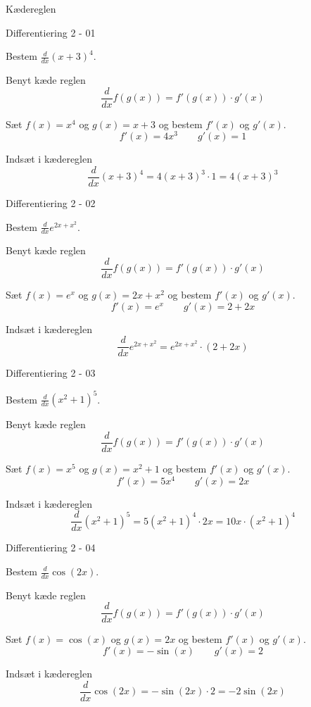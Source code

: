 \documentclass{article}
\begin{document}
Kædereglen
\tableofcontents
\newpage

\begin{exercise}{Differentiering 2 - 01}

Bestem $\frac{d}{dx} (x + 3)^4$.


\hint
Benyt kæde reglen
\[
\frac{d}{dx} f(g(x)) = f'(g(x)) \cdot g'(x)
\]

\hint
Sæt $f(x) = x^4$ og $g(x) = x + 3$ og bestem $f'(x)$ og $g'(x)$.
\[
f'(x) = 4 x^3 \qquad g'(x) = 1
\]

\hint
Indsæt i kædereglen
\[
\frac{d}{dx} (x + 3)^4 = 4 (x + 3)^3 \cdot 1 = 4 (x + 3)^3
\]

\end{exercise}

\begin{exercise}{Differentiering 2 - 02}

Bestem $\frac{d}{dx} e^{2x + x^2}$.


\hint
Benyt kæde reglen
\[
\frac{d}{dx} f(g(x)) = f'(g(x)) \cdot g'(x)
\]

\hint
Sæt $f(x) = e^x$ og $g(x) = 2x + x^2$ og bestem $f'(x)$ og $g'(x)$.
\[
f'(x) = e^x \qquad g'(x) = 2 + 2x
\]

\hint
Indsæt i kædereglen
\[
\frac{d}{dx} e^{2x + x^2} = e^{2x + x^2} \cdot (2 + 2x)
\]

\end{exercise}

\begin{exercise}{Differentiering 2 - 03}
	
	Bestem $\frac{d}{dx} \left(x^2 + 1	\right)^5 $.
	
	
	\hint
	Benyt kæde reglen
	\[
	\frac{d}{dx} f(g(x)) = f'(g(x)) \cdot g'(x)
	\]
	
	\hint
	Sæt $f(x) = x^5$ og $g(x) = x^2 + 1$ og bestem $f'(x)$ og $g'(x)$.
	\[
	f'(x) = 5x^4  \qquad g'(x) = 2x
	\]
	
	\hint
	Indsæt i kædereglen
	\[
	\frac{d}{dx} \left(x^2 + 1 \right)^5 = 5 \left(x^2 + 1 \right)^4 \cdot 2x = 10 x \cdot \left(x^2 + 1 \right)^4
	\]
	
\end{exercise}

\begin{exercise}{Differentiering 2 - 04}
	
	Bestem $\frac{d}{dx} \cos(2x)$.
	
	
	\hint
	Benyt kæde reglen
	\[
	\frac{d}{dx} f(g(x)) = f'(g(x)) \cdot g'(x)
	\]
	
	\hint
	Sæt $f(x) = \cos(x)$ og $g(x) = 2x$ og bestem $f'(x)$ og $g'(x)$.
	\[
	f'(x) = - \sin(x) \qquad g'(x) = 2
	\]
	
	\hint
	Indsæt i kædereglen
	\[
	\frac{d}{dx} \cos(2x) = -\sin(2x) \cdot 2 = -2 \sin(2x)
	\]
	
\end{exercise}
\end{document}
